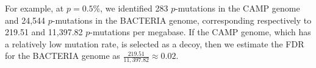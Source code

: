 For example, at $p=0.5$\%, we identified 283 $p$-mutations in the CAMP genome and 24,544 $p$-mutations in the BACTERIA genome, corresponding respectively to 219.51 and 11,397.82 $p$-mutations per megabase. If the CAMP genome, which has a relatively low mutation rate, is selected as a decoy, then we estimate the FDR for the BACTERIA genome as $\frac{219.51}{11,397.82} \approx 0.02$.\endinput